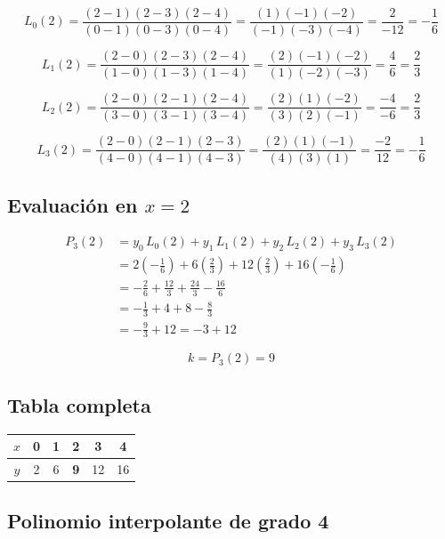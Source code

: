 \documentclass[12pt,a4paper]{article}
\begin{document}
\[
  L_0(2)
  = \frac{(2-1)(2-3)(2-4)}{(0-1)(0-3)(0-4)}
  = \frac{(1)(-1)(-2)}{(-1)(-3)(-4)}
  = \frac{2}{-12}
  = -\dfrac{1}{6}
\]

\[
  L_1(2)
  = \frac{(2-0)(2-3)(2-4)}{(1-0)(1-3)(1-4)}
  = \frac{(2)(-1)(-2)}{(1)(-2)(-3)}
  = \frac{4}{6}
  = \dfrac{2}{3}
\]

\[
  L_2(2)
  = \frac{(2-0)(2-1)(2-4)}{(3-0)(3-1)(3-4)}
  = \frac{(2)(1)(-2)}{(3)(2)(-1)}
  = \frac{-4}{-6}
  = \dfrac{2}{3}
\]

\[
  L_3(2)
  = \frac{(2-0)(2-1)(2-3)}{(4-0)(4-1)(4-3)}
  = \frac{(2)(1)(-1)}{(4)(3)(1)}
  = \frac{-2}{12}
  = -\dfrac{1}{6}
\]

\subsection*{Evaluaci\'on en $x=2$}

\begin{align*}
  P_3(2) &= y_0\,L_0(2) + y_1\,L_1(2) + y_2\,L_2(2) + y_3\,L_3(2) \\
         &= 2\!\left(-\tfrac{1}{6}\right) + 6\!\left(\tfrac{2}{3}\right)
            + 12\!\left(\tfrac{2}{3}\right) + 16\!\left(-\tfrac{1}{6}\right) \\
         &= -\tfrac{2}{6} + \tfrac{12}{3} + \tfrac{24}{3} - \tfrac{16}{6} \\
         &= -\tfrac{1}{3} + 4 + 8 - \tfrac{8}{3} \\
         &= -\tfrac{9}{3} + 12
         = -3 + 12
\end{align*}

\[
  \boxed{k = P_3(2) = 9}
\]

\subsection*{Tabla completa}

\begin{center}
\renewcommand{\arraystretch}{1.4}
\begin{tabular}{c|ccccc}
\toprule
$x$ & 0 & 1 & 2 & 3 & 4 \\
\midrule
$y$ & 2 & 6 & \textbf{9} & 12 & 16 \\
\bottomrule
\end{tabular}
\end{center}

\subsection*{Polinomio interpolante de grado 4}
\end{document}
